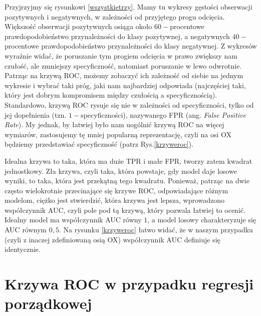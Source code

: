 \documentclass{mini}
\begin{document}
Przyjrzyjmy się rysunkowi \ref{wszystkietrzy}. Mamy tu wykresy gęstości obserwacji pozytywnych i negatywnych, w zależności od przyjętego progu odcięcia. Większość obserwacji pozytywnych osiąga około $60-$procentowe prawdopodobieństwo przynależności do klasy pozytywnej, a negatywnych $40-$procentowe prawdopodobieństwo przynależności do klasy negatywnej. Z wykresów wyraźnie widać, że poruszanie tym progiem odcięcia w prawo zwiększy nam czułość, ale zmniejszy specyficzność, natomiast poruszanie w lewo odwrotnie. Patrząc na krzywą ROC, możemy zobaczyć ich zależność od siebie na jednym wykresie i wybrać taki próg, jaki nam najbardziej odpowiada (najczęściej taki, który jest dobrym kompromisem między czułością a specyficznością). Standardowo, krzywą ROC rysuje się nie w zależności od specyficzności, tylko od jej dopełnienia (tzn. $1-$specyficzności), nazywanego FPR (ang. \textit{False Positive Rate}). My jednak, by łatwiej było nam uogólnić krzywą ROC na więcej wymiarów, zastosujemy tę mniej popularną reprezentację, czyli na osi OX będziemy przedstawiać specyficzność (patrz Rys.\ref{krzyweroc}). 

Idealna krzywa to taka, która ma duże TPR i małe FPR, tworzy zatem kwadrat jednostkowy. Zła krzywa, czyli taka, która powstaje, gdy model daje losowe wyniki, to taka, która jest przekątną tego kwadratu. Ponieważ, patrząc na dwie często wielokrotnie przecinające się krzywe ROC, odpowiadające różnym modelom, ciężko jest stwierdzić, która krzywa jest lepsza, wprowadzono współczynnik AUC, czyli pole pod tą krzywą, który pozwala łatwiej to ocenić. Idealny model ma współczynnik AUC równy $1$, a model losowy charakteryzuje się AUC równym $0,5$. Na rysunku \ref{krzyweroc} łatwo widać, że w naszym przypadku (czyli z inaczej zdefiniowaną osią OX) współczynnik AUC definiuje się identycznie.       

\section{Krzywa ROC w przypadku regresji porządkowej}
\end{document}
